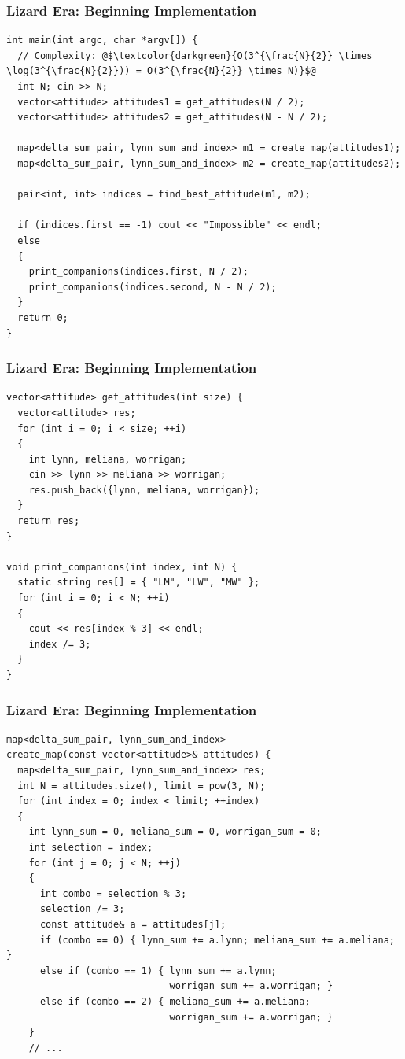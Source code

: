\documentclass{beamer}
\begin{document}
\begin{frame}[containsverbatim]
\frametitle{Lizard Era: Beginning Implementation}
\scriptsize

\begin{lstlisting}
int main(int argc, char *argv[]) {
  // Complexity: @$\textcolor{darkgreen}{O(3^{\frac{N}{2}} \times \log(3^{\frac{N}{2}})) = O(3^{\frac{N}{2}} \times N)}$@
  int N; cin >> N;
  vector<attitude> attitudes1 = get_attitudes(N / 2);
  vector<attitude> attitudes2 = get_attitudes(N - N / 2);

  map<delta_sum_pair, lynn_sum_and_index> m1 = create_map(attitudes1);
  map<delta_sum_pair, lynn_sum_and_index> m2 = create_map(attitudes2);

  pair<int, int> indices = find_best_attitude(m1, m2);

  if (indices.first == -1) cout << "Impossible" << endl;
  else
  {
    print_companions(indices.first, N / 2);
    print_companions(indices.second, N - N / 2);
  }
  return 0;
}
\end{lstlisting}

\end{frame}

\begin{frame}[containsverbatim]
\frametitle{Lizard Era: Beginning Implementation}
\scriptsize

\begin{lstlisting}
vector<attitude> get_attitudes(int size) {
  vector<attitude> res;
  for (int i = 0; i < size; ++i)
  {
    int lynn, meliana, worrigan;
    cin >> lynn >> meliana >> worrigan;
    res.push_back({lynn, meliana, worrigan});
  }
  return res;
}

void print_companions(int index, int N) {
  static string res[] = { "LM", "LW", "MW" };
  for (int i = 0; i < N; ++i)
  {
    cout << res[index % 3] << endl;
    index /= 3;
  }
}
\end{lstlisting}

\end{frame}

\begin{frame}[containsverbatim]
\frametitle{Lizard Era: Beginning Implementation}
\scriptsize

\begin{lstlisting}
map<delta_sum_pair, lynn_sum_and_index>
create_map(const vector<attitude>& attitudes) {
  map<delta_sum_pair, lynn_sum_and_index> res;
  int N = attitudes.size(), limit = pow(3, N);
  for (int index = 0; index < limit; ++index)
  {
    int lynn_sum = 0, meliana_sum = 0, worrigan_sum = 0;
    int selection = index;
    for (int j = 0; j < N; ++j)
    {
      int combo = selection % 3;
      selection /= 3;
      const attitude& a = attitudes[j];
      if (combo == 0) { lynn_sum += a.lynn; meliana_sum += a.meliana; }
      else if (combo == 1) { lynn_sum += a.lynn;
                             worrigan_sum += a.worrigan; }
      else if (combo == 2) { meliana_sum += a.meliana;
                             worrigan_sum += a.worrigan; }
    }
    // ...
\end{lstlisting}

\end{frame}
\end{document}
